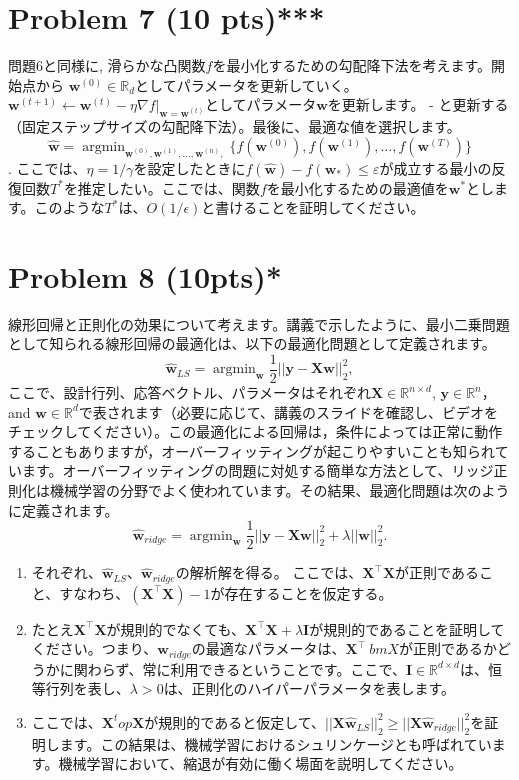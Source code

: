 \documentclass{jsarticle}
\DeclareMathOperator*{\argmin}{argmin}
\begin{document}
\section*{Problem 7 (10 pts)***}
問題6と同様に, 滑らかな凸関数$f$を最小化するための勾配降下法を考えます。開始点から $\bm w^{(0)} \in \mathbb R_d$としてパラメータを更新していく。$\bm w^{(t+1)} \leftarrow \bm w^{(t)} − \eta \nabla f|_{\bm w=\bm w^{(t)}}$としてパラメータ$\bm w$を更新します。 - と更新する（固定ステップサイズの勾配降下法）。最後に、最適な値を選択します。
$$
\hat{\bm w} = \argmin_{\bm w^{(0)},\bm w^{(1)},\ldots,\bm w^{(n)},} \{f(\bm w^{(0)}),f(\bm w^{(1)}),\ldots,f(\bm w^{(T)})\}
$$
. ここでは、$\eta = 1/\gamma$を設定したときに$f(\hat{\bm w})−f(\bm w_*) \le \varepsilon$が成立する最小の反復回数$T^*$を推定したい。ここでは、関数$f$を最小化するための最適値を$\bm w^*$とします。このような$T^*$は、$O(1/\epsilon)$と書けることを証明してください。

\section*{Problem 8 (10pts)*}
線形回帰と正則化の効果について考えます。講義で示したように、最小二乗問題として知られる線形回帰の最適化は、以下の最適化問題として定義されます。
$$
\hat{\bm w}_{LS} = \argmin_{\bm w} \frac{1}{2}||\bm y − \bm X\bm w||_2^2,
$$
ここで、設計行列、応答ベクトル、パラメータはそれぞれ$\bm X \in \mathbb R^{n×d}$, $\bm y \in \mathbb R^n$，and $\bm w \in \mathbb R^d$で表されます（必要に応じて、講義のスライドを確認し、ビデオをチェックしてください）。この最適化による回帰は，条件によっては正常に動作することもありますが，オーバーフィッティングが起こりやすいことも知られています。オーバーフィッティングの問題に対処する簡単な方法として、リッジ正則化は機械学習の分野でよく使われています。その結果、最適化問題は次のように定義されます。
$$
\hat{\bm w}_{ridge} = \argmin_{\bm w} \frac{1}{2}||\bm y − \bm X\bm w||_2^2 + \lambda||\bm w||_2^2.
$$
\begin{enumerate}
  \item それぞれ、$\hat{\bm w}_{LS}$、$\hat{\bm w}_{ridge}$の解析解を得る。
  ここでは、$\bm X^\top \bm X$が正則であること、すなわち、$(\bm X^\top \bm X)−1$が存在することを仮定する。
  \item たとえ$\bm X^\top \bm X$が規則的でなくても、$\bm X^\top \bm X + \lambda \bm I$が規則的であることを証明してください。つまり、$\bm w_{ridge}$の最適なパラメータは、$\bm X^\top \ bm X$が正則であるかどうかに関わらず、常に利用できるということです。ここで、$\bm I \in \mathbb R^{d×d}$は、恒等行列を表し、$\lambda > 0$は、正則化のハイパーパラメータを表します。
  \item ここでは、$\bm X^top \bm X$が規則的であると仮定して、$||\bm X\hat{\bm w}_{LS}||_2^2 \ge ||\bm X\hat{\bm w}_{ridge}||_2^2$を証明します。この結果は、機械学習におけるシュリンケージとも呼ばれています。機械学習において、縮退が有効に働く場面を説明してください。
\end{enumerate}
　
\end{document}
